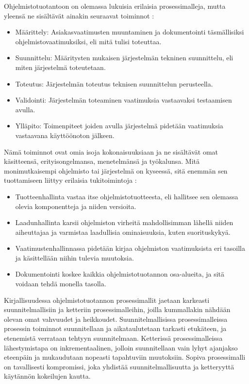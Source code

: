\documentclass[finnish,12pt,a4paper,pdftex]{article}
\begin{document}
Ohjelmistotuotantoon on olemassa lukuisia erilaisia prosessimalleja, mutta yleensä ne sisältävät ainakin seuraavat toiminnot \citep{ohjelmistotuotanto}:

\begin{itemize}
\setlength{\itemsep}{0pt}
    \item Määrittely: Asiakasvaatimusten muuntaminen ja dokumentointi täsmällisiksi ohjelmistovaatimuksiksi, eli mitä tulisi toteuttaa.
    \item Suunnittelu: Määritysten mukaisen järjestelmän tekninen suunnittelu, eli miten järjestelmä toteutetaan.
    \item Toteutus: Järjestelmän toteutus teknisen suunnittelun perusteella.
    \item Validointi: Järjestelmän toteaminen vaatimuksia vastaavaksi testaamisen avulla. 
    \item Ylläpito: Toimenpiteet joiden avulla järjestelmä pidetään vaatimuksia vastaavana käyttöönoton jälkeen.
\end{itemize}

Nämä toiminnot ovat omia isoja kokonaisuuksiaan ja ne sisältävät omat käsitteensä, erityisongelmansa, menetelmänsä ja työkalunsa. Mitä monimutkaisempi ohjelmisto tai järjestelmä on kyseessä, sitä enemmän sen tuottamiseen liittyy erilaisia tukitoimintoja \citep{okaytannot}:

\begin{itemize}
\setlength{\itemsep}{0pt}
    \item Tuotteenhallinta vastaa itse ohjelmistotuotteesta, eli hallitsee sen olemassa olevia komponentteja ja niiden versioita.
    \item Laadunhallinta karsii ohjelmiston virheitä mahdollisimman lähellä niiden aiheuttajaa ja varmistaa laadullisia ominaisuuksia, kuten suorituskykyä.
    \item Vaatimustenhallinnassa pidetään kirjaa ohjelmiston vaatimuksista eri tasoilla ja käsittellään niihin tulevia muutoksia.
    \item Dokumentointi koskee kaikkia ohjelmistotuotannon osa-alueita, ja sitä voidaan tehdä monella tasolla. 
\end{itemize}

Kirjallisuudessa ohjelmistotuotannon prosessimallit jaetaan karkeasti suunnitelmallisiin ja ketteriin prosessimalleihin, joilla kummallakin nähdään olevan omat vahvuudet ja heikkoudet. Suunnitelmallisissa prosessimalleissa prosessin toiminnot suunnitellaan ja aikataulutetaan tarkasti etukäteen, ja etenemistä verrataan tehtyyn suunnitelmaan. Ketterissä prosessimalleissa lähestymistapa on inkrementaalinen, jolloin suunnitellaan vain lyhyt ajanjakso eteenpäin ja mukaudutaan nopeasti tapahtuviin muutoksiin. Sopiva prosessimalli on tavallisesti kompromissi, joka yhdistää suunnitelmallisuutta ja ketteryyttä käytännön kokeilujen kautta. \citep{sommerville}\\
\end{document}
